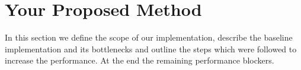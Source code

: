 \section{Your Proposed Method}\label{sec:yourmethod}






In this section we define the scope of our implementation, describe the baseline
implementation and its bottlenecks and outline the steps which were followed to
increase the performance. At the end the remaining performance blockers.

